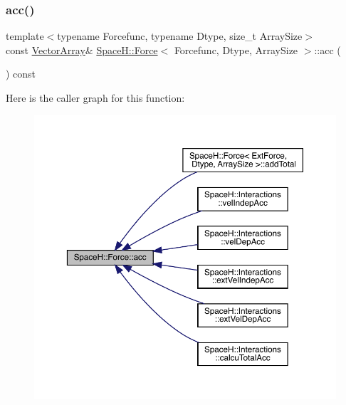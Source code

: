 \subsubsection{\texorpdfstring{acc()}{acc()}\hspace{0.1cm}{\footnotesize\ttfamily [1/2]}}
{\footnotesize\ttfamily template$<$typename Forcefunc, typename Dtype, size\+\_\+t Array\+Size$>$ \\
const \mbox{\hyperlink{struct_space_h_1_1_force_aa58fd21903006c1d033713d04b4719f3}{Vector\+Array}}\& \mbox{\hyperlink{struct_space_h_1_1_force}{Space\+H\+::\+Force}}$<$ Forcefunc, Dtype, Array\+Size $>$\+::acc (\begin{DoxyParamCaption}{ }\end{DoxyParamCaption}) const\hspace{0.3cm}{\ttfamily [inline]}}

Here is the caller graph for this function\+:
\nopagebreak
\begin{figure}[H]
\begin{center}
\leavevmode
\includegraphics[width=350pt]{struct_space_h_1_1_force_ac4f8ce97d4513859ad94064ed35ab300_icgraph}
\end{center}
\end{figure}
\mbox{\label{struct_space_h_1_1_force_abff837e46b01461762054d79ebee0fb8}} 
